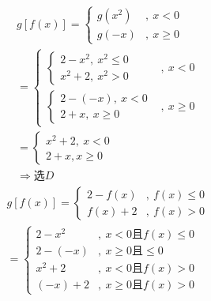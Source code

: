 \begin{Answer}
    \[
    \begin{aligned}
        &g[f(x)]=\begin{cases}
            g(x^2)&,\ x<0\\
            g(-x)&,\ x \ge 0
        \end{cases}\\
        &=\begin{cases}
            \begin{cases}
                2-x^2,\ x^2 \le 0\\
                x^2+2,\ x^2>0
            \end{cases}&,\ x<0\\
            \begin{cases}
                2-(-x),\ x<0\\
                2+x,\ x \ge 0
            \end{cases}&,\ x \ge 0
        \end{cases}\\
        &=\begin{cases}
            x^2+2,\ x<0\\
            2+x, x \ge 0
        \end{cases}\\
        &\Rightarrow \text{选}D
    \end{aligned}
    \]
    \[
    \begin{aligned}
        &g[f(x)]=\begin{cases}
            2-f(x)&,\ f(x) \le 0\\
            f(x)+2&,\ f(x) > 0
        \end{cases}\\
        &=\begin{cases}
            2-x^2&,\ x<0\text{且}f(x)\le 0\\
            2-(-x)&,\ x \ge 0 \text{且}\le 0\\
            x^2+2&,\ x<0\text{且}f(x)>0\\
            (-x)+2&,\ x \ge 0 \text{且}f(x)>0
        \end{cases}
    \end{aligned}
    \]
\end{Answer}
